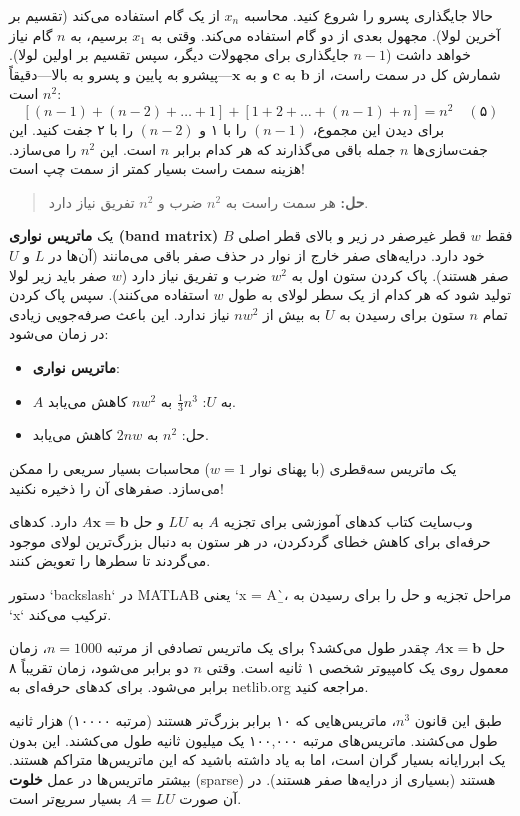 \documentclass[12pt, a4paper]{book}
\begin{document}
	حالا جایگذاری پسرو را شروع کنید. محاسبه $x_n$ از یک گام استفاده می‌کند (تقسیم بر آخرین لولا). مجهول بعدی از دو گام استفاده می‌کند. وقتی به $x_1$ برسیم، به $n$ گام نیاز خواهد داشت ($n-1$ جایگذاری برای مجهولات دیگر، سپس تقسیم بر اولین لولا). شمارش کل در سمت راست، از $\mathbf{b}$ به $\mathbf{c}$ و به $\mathbf{x}$—پیشرو به پایین و پسرو به بالا—دقیقاً $n^2$ است:
	\[ [(n-1) + (n-2) + \dots + 1] + [1 + 2 + \dots + (n-1) + n] = n^2 \quad (۵) \]
	برای دیدن این مجموع، $(n-1)$ را با ۱ و $(n-2)$ را با ۲ جفت کنید. این جفت‌سازی‌ها $n$ جمله باقی می‌گذارند که هر کدام برابر $n$ است. این $n^2$ را می‌سازد. هزینه سمت راست بسیار کمتر از سمت چپ است!
	\begin{quote}
		\textbf{حل:} هر سمت راست به $n^2$ ضرب و $n^2$ تفریق نیاز دارد.
	\end{quote}
	یک \textbf{ماتریس نواری (band matrix)} $B$ فقط $w$ قطر غیرصفر در زیر و بالای قطر اصلی خود دارد. درایه‌های صفر خارج از نوار در حذف صفر باقی می‌مانند (آن‌ها در $L$ و $U$ صفر هستند). پاک کردن ستون اول به $w^2$ ضرب و تفریق نیاز دارد ($w$ صفر باید زیر لولا تولید شود که هر کدام از یک سطر لولای به طول $w$ استفاده می‌کنند). سپس پاک کردن تمام $n$ ستون برای رسیدن به $U$ به بیش از $nw^2$ نیاز ندارد. این باعث صرفه‌جویی زیادی در زمان می‌شود:
	\begin{itemize}
		\item \textbf{ماتریس نواری}:
		\item $A$ به $U$: $\frac{1}{3}n^3$ به $nw^2$ کاهش می‌یابد.
		\item حل: $n^2$ به $2nw$ کاهش می‌یابد.
	\end{itemize}
	یک ماتریس سه‌قطری (با پهنای نوار $w=1$) محاسبات بسیار سریعی را ممکن می‌سازد. صفرهای آن را ذخیره نکنید!
	
	وب‌سایت کتاب کدهای آموزشی برای تجزیه $A$ به $LU$ و حل $A\mathbf{x}=\mathbf{b}$ دارد. کدهای حرفه‌ای برای کاهش خطای گردکردن، در هر ستون به دنبال بزرگ‌ترین لولای موجود می‌گردند تا سطرها را تعویض کنند.
	
	دستور `backslash` در MATLAB یعنی `x = A\b`، مراحل تجزیه و حل را برای رسیدن به `x` ترکیب می‌کند.
	
	حل $A\mathbf{x}=\mathbf{b}$ چقدر طول می‌کشد؟ برای یک ماتریس تصادفی از مرتبه $n=1000$، زمان معمول روی یک کامپیوتر شخصی ۱ ثانیه است. وقتی $n$ دو برابر می‌شود، زمان تقریباً ۸ برابر می‌شود. برای کدهای حرفه‌ای به netlib.org مراجعه کنید.
	
	طبق این قانون $n^3$، ماتریس‌هایی که ۱۰ برابر بزرگ‌تر هستند (مرتبه ۱۰۰۰۰) هزار ثانیه طول می‌کشند. ماتریس‌های مرتبه ۱۰۰,۰۰۰ یک میلیون ثانیه طول می‌کشند. این بدون یک ابررایانه بسیار گران است، اما به یاد داشته باشید که این ماتریس‌ها متراکم هستند. بیشتر ماتریس‌ها در عمل \textbf{خلوت} (sparse) هستند (بسیاری از درایه‌ها صفر هستند). در آن صورت $A=LU$ بسیار سریع‌تر است.
	
\end{document}
